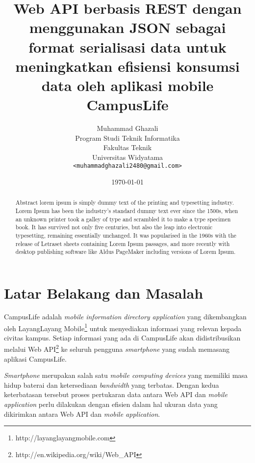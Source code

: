 \documentclass[a4paper, 12pt]{report}
\title{\textbf{Web API berbasis REST dengan menggunakan JSON sebagai format serialisasi data untuk meningkatkan efisiensi konsumsi data oleh aplikasi mobile CampusLife}}
\author{
Muhammad Ghazali\\
Program Studi Teknik Informatika\\
Fakultas Teknik\\
Universitas Widyatama
\\ \texttt{<muhammadghazali2480@gmail.com>}
}
\date{\today}
\begin{document}
\maketitle

\onehalfspacing
\tableofcontents
\setcounter{tocdepth}{3}

\listoffigures
\listoftables

\begin{abstract}
\onehalfspacing Abstract lorem ipsum is simply dummy text of the printing and typesetting industry. Lorem Ipsum has been the industry's standard dummy text ever since the 1500s, when an unknown printer took a galley of type and scrambled it to make a type specimen book. It has survived not only five centuries, but also the leap into electronic typesetting, remaining essentially unchanged. It was popularised in the 1960s with the release of Letraset sheets containing Lorem Ipsum passages, and more recently with desktop publishing software like Aldus PageMaker including versions of Lorem Ipsum.
\end{abstract}

\section*{Latar Belakang dan Masalah}
\onehalfspacing CampusLife adalah \textit{mobile information directory application} yang dikembangkan oleh LayangLayang Mobile\footnote{http://layanglayangmobile.com} untuk menyediakan informasi yang relevan kepada civitas kampus. Setiap informasi yang ada di CampusLife akan didistribusikan melalui Web API\footnote{http://en.wikipedia.org/wiki/Web\_API} ke seluruh pengguna \textit{smartphone} yang sudah memasang aplikasi CampusLife.

\onehalfspacing \textit{Smartphone} merupakan salah satu \textit{mobile computing devices} yang memiliki masa hidup baterai dan ketersediaan \textit{bandwidth} yang terbatas.\cite{challenging-issues-and-limitations-of-mobile-computing} Dengan kedua keterbatasan tersebut proses pertukaran data antara Web API dan \textit{mobile application} perlu dilakukan dengan efisien dalam hal ukuran data yang dikirimkan antara Web API dan \textit{mobile application}.
\end{document}
